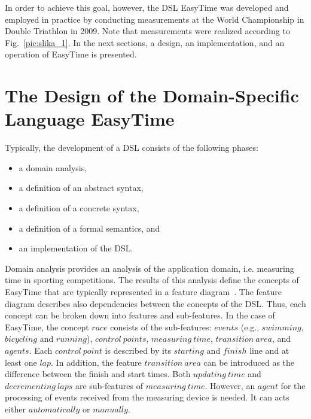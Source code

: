 \documentclass[preprint, prX]{revtex4}
\begin{document}
In order to achieve this goal, however, the DSL EasyTime was developed and employed in practice by conducting measurements at the World Championship in Double Triathlon in 2009. Note that measurements were realized according to Fig.~\ref{pic:slika_1}. In the next sections, a design, an implementation, and an operation of EasyTime is presented.



\section{The Design of the Domain-Specific Language EasyTime}

Typically, the development of a DSL consists of the following phases:
\begin{itemize}
  \item a domain analysis,
  \item a definition of an abstract syntax,
  \item a definition of a concrete syntax,
  \item a definition of a formal semantics, and
  \item an implementation of the DSL.
\end{itemize}
Domain analysis provides an analysis of the application domain, i.e. measuring time in sporting competitions. The results of this
analysis define the concepts of EasyTime that are typically represented in a feature diagram~\cite{Deursen:2002}. The feature diagram
describes also dependencies between the concepts of the DSL. Thus, each concept can be broken down into features and sub-features. In
the case of EasyTime, the concept $race$ consists of the sub-features: $events$ (e.g., $swimming$, $bicycling$ and $running$), $control\ points$, $measuring\ time$, $transition\ area$, and $agents$. Each $control\ point$ is described by its $starting$ and $finish$ line and at least one $lap$. In addition, the feature $transition\ area$ can be introduced as the difference between the finish and start times. Both $updating\ time$ and $decrementing\ laps$ are sub-features of $measuring\ time$. However, an $agent$ for the processing of events received from the measuring device is needed. It can acts either $automatically$ or $manually$.
\end{document}
